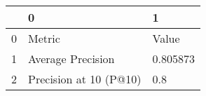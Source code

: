 \begin{tabular}{lll}
\toprule
{} &                       0 &         1 \\
\midrule
0 &                  Metric &     Value \\
1 &       Average Precision &  0.805873 \\
2 &  Precision at 10 (P@10) &       0.8 \\
\bottomrule
\end{tabular}

